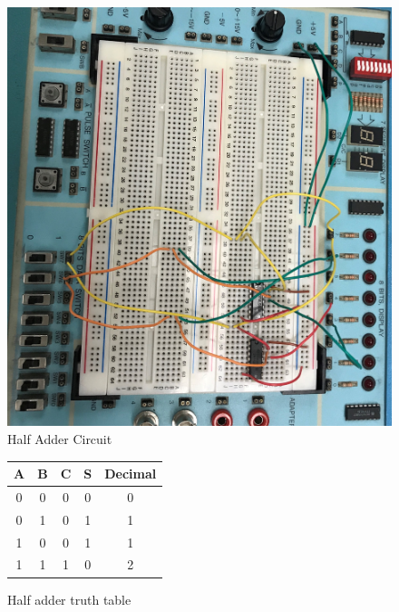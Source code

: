 \documentclass[11pt]{article}
\begin{document}
\begin{figure}
	\includegraphics [width=1.0\textwidth]{"HALFADDER"}
	\caption{Half Adder Circuit}

\end{figure}
\begin{figure}[ht]\centering
	\begin{tabular}{cc|cc|c}
		\toprule
		A & B & C & S & Decimal \\
		\midrule
		0 & 0 & 0 & 0 & 0 \\
		0 & 1 & 0 & 1 & 1 \\
		1 & 0 & 0 & 1 & 1 \\
		1 & 1 & 1 & 0 & 2 \\
		\bottomrule
	\end{tabular} 
	
	\caption{Half adder truth table}
	
\end{figure}
\end{document}
